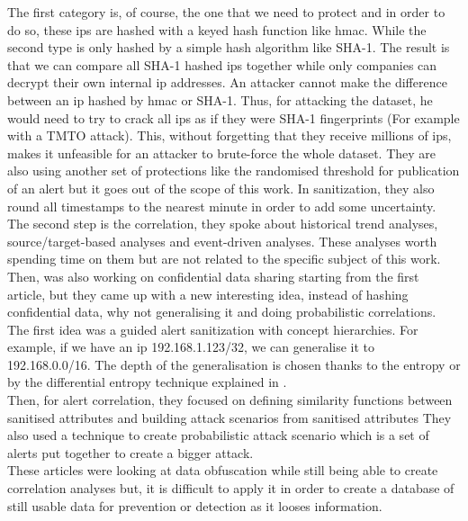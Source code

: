 \documentclass{eplmastersthesis}
\begin{document}
The first category is, of course, the one that we need to protect and in order to do so, these \glspl{ip} are hashed with a keyed hash function like \gls{hmac}. While the second type is only hashed by a simple hash algorithm like SHA-1.
The result is that we can compare all SHA-1 hashed \glspl{ip} together while only companies can decrypt their own internal \gls{ip} addresses.
An attacker cannot make the difference between an \gls{ip} hashed by \gls{hmac}  or SHA-1. Thus, for attacking the dataset, he would need to try to crack all \glspl{ip} as if they were SHA-1 fingerprints (For example with a TMTO attack). This, without forgetting that they receive millions of \glspl{ip}, makes it unfeasible for an attacker to brute-force the whole dataset.
They are also using another set of protections like the randomised threshold for publication of an alert but it goes out of the scope of this work.
In sanitization, they also round all timestamps to the nearest minute in order to add some uncertainty.
The second step is the correlation, they spoke about historical trend analyses, source/target-based analyses and event-driven analyses. These analyses worth spending time on them but are not related to the specific subject of this work.\\

Then, \cite{xu2005privacy} was also working on confidential data sharing starting from the first article, but they came up with a new interesting idea, instead of hashing confidential data, why not generalising it and doing probabilistic correlations.
The first idea was a guided alert sanitization with concept hierarchies. For example, if we have an \gls{ip} 192.168.1.123/32, we can generalise it to 192.168.0.0/16.
The depth of the generalisation is chosen thanks to the entropy or by the differential entropy technique explained in \cite{cover1991elements}.
\\
Then, for alert correlation, they focused on defining similarity functions between sanitised attributes and building attack scenarios from sanitised attributes
They also used a technique to create probabilistic attack scenario which is a set of alerts put together to create a bigger attack.\\

These articles were looking at data obfuscation while still being able to create correlation analyses but, it is difficult to apply it in order to create a database of still usable data for prevention or detection as it looses information.
\\
\end{document}
